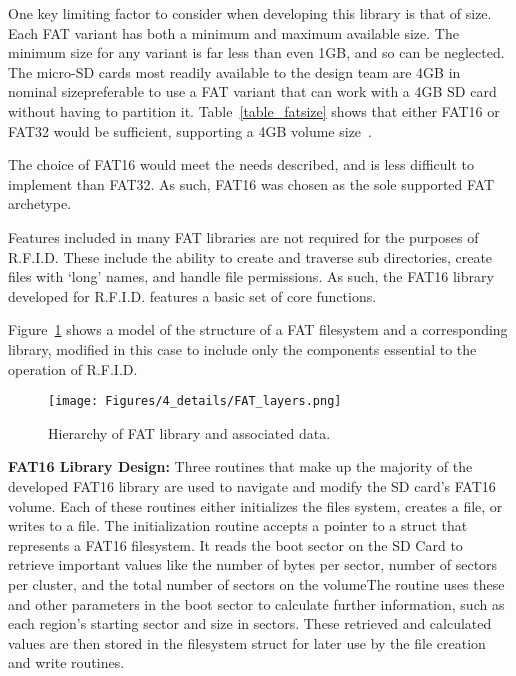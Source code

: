 One key limiting factor to consider when developing this library is that of size. Each FAT variant has both a minimum and maximum available size. The minimum size for any variant is far less than even 1GB, and so can be neglected. The micro-SD cards most readily available to the design team are 4GB in nominal size\DIFdelbegin {}\DIFdelend \DIFaddbegin {}\DIFaddend preferable to use a FAT variant that can work with a 4GB SD card without having to partition it. Table~\ref{table_fatsize} shows that either FAT16 or FAT32 would be sufficient, supporting a 4GB volume size~\cite{src_FAT-filesizes}.



The choice of FAT16 would meet the needs described, and is less difficult to implement than FAT32. As such, FAT16 was chosen as the sole supported FAT archetype. 

Features included in many FAT libraries are not required for the purposes of R.F.I.D. These include the ability to create and traverse sub directories, create files with `long' names, and handle file permissions. As such, the FAT16 library developed for R.F.I.D. features a basic set of core functions.

Figure~\ref{fig:FAT_layers} shows a model of the structure of a FAT filesystem and a corresponding library, modified in this case to include only the components essential to the operation of R.F.I.D.

\begin{figure}[H]
    \centering
    \texttt{[image: Figures/4\_details/FAT\_layers.png]} 
    \caption{Hierarchy of FAT library and associated data.}
    \label{fig:FAT_layers}
\end{figure}

\label{ssss:FAT_design}
\textbf{FAT16 Library Design:}
Three routines that make up the majority of the developed FAT16 library are used to navigate and modify the SD card's FAT16 volume. Each of these routines either initializes the files system, creates a file, or writes to a file. The initialization routine accepts a pointer to a struct that represents a FAT16 filesystem. It reads the boot sector on the SD Card to retrieve important values like the number of bytes per sector, number of sectors per cluster, and the total number of sectors on the volume\DIFaddbegin {}\DIFaddend The routine uses these and other parameters in the boot sector to calculate further information, such as each region's starting sector and size in sectors. These retrieved and calculated values are then stored in the filesystem struct for later use by the file creation and write routines.

